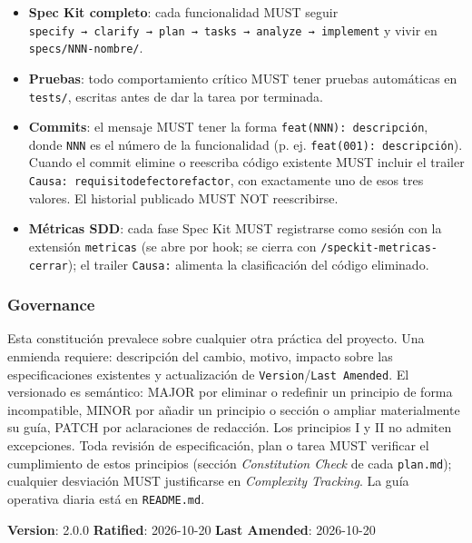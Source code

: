 \documentclass[12pt,a4paper]{article}
\providecommand{\tightlist}{\setlength{\itemsep}{0pt}\setlength{\parskip}{0pt}}
\newenvironment{documentogenerado}[2]{%
  \def\doccomando{#1}\def\docruta{#2}%
  \par\begingroup\small\setstretch{1.15}\sloppy%
}{\endgroup\par\medskip}
\begin{document}
\begin{documentogenerado}{/speckit-constitution}{.specify\slash memory\slash constitution.md}
\begin{itemize}
\tightlist
\item
  \textbf{Spec Kit completo}: cada funcionalidad MUST seguir \texttt{specify\ →\ clarify\ →\ plan\ →\ tasks\ →\ analyze\ →\ implement} y vivir en \texttt{specs/\allowbreak{}\hspace{0pt}NNN-\allowbreak{}nombre/\allowbreak{}\hspace{0pt}}.
\item
  \textbf{Pruebas}: todo comportamiento crítico MUST tener pruebas automáticas en \texttt{tests/}, escritas antes
  de dar la tarea por terminada.
\item
  \textbf{Commits}: el mensaje MUST tener la forma \texttt{feat(NNN):\ descripción}, donde \texttt{NNN} es el número de la
  funcionalidad (p. ej. \texttt{feat(001):\ descripción}). Cuando el commit elimine o reescriba código
  existente MUST incluir el trailer \texttt{Causa:\ requisito\textbar{}defecto\textbar{}refactor}, con exactamente uno de esos
  tres valores. El historial publicado MUST NOT reescribirse.
\item
  \textbf{Métricas SDD}: cada fase Spec Kit MUST registrarse como sesión con la extensión \texttt{metricas}
  (se abre por hook; se cierra con \texttt{/\allowbreak{}speckit-\allowbreak{}metricas-\allowbreak{}cerrar}); el trailer \texttt{Causa:} alimenta la
  clasificación del código eliminado.
\end{itemize}

\subsubsection{Governance}

Esta constitución prevalece sobre cualquier otra práctica del proyecto. Una enmienda requiere:
descripción del cambio, motivo, impacto sobre las especificaciones existentes y actualización de
\texttt{Version}/\texttt{Last\ Amended}. El versionado es semántico: MAJOR por eliminar o redefinir un principio de
forma incompatible, MINOR por añadir un principio o sección o ampliar materialmente su guía, PATCH por
aclaraciones de redacción. Los principios I y II no admiten excepciones. Toda revisión de
especificación, plan o tarea MUST verificar el cumplimiento de estos principios (sección
\emph{Constitution Check} de cada \texttt{plan.\allowbreak{}md}); cualquier desviación MUST justificarse en \emph{Complexity
Tracking}. La guía operativa diaria está en \texttt{README.\allowbreak{}md}.

\textbf{Version}: 2.0.0 \textbar{} \textbf{Ratified}: 2026-10-20 \textbar{} \textbf{Last Amended}: 2026-10-20
\end{documentogenerado}
\end{document}
